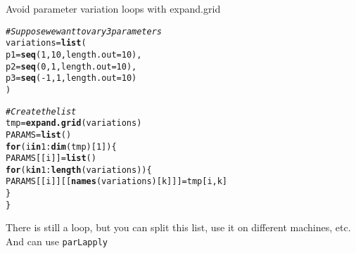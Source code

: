 \documentclass[aspectratio=169]{beamer}\usepackage[]{graphicx}\usepackage[]{xcolor}
\makeatletter
\newcommand{\hlnum}[1]{\textcolor[rgb]{0.686,0.059,0.569}{#1}}%
\newcommand{\hlcom}[1]{\textcolor[rgb]{0.678,0.584,0.686}{\textit{#1}}}%
\newcommand{\hlopt}[1]{\textcolor[rgb]{0,0,0}{#1}}%
\newcommand{\hldef}[1]{\textcolor[rgb]{0.345,0.345,0.345}{#1}}%
\newcommand{\hlkwa}[1]{\textcolor[rgb]{0.161,0.373,0.58}{\textbf{#1}}}%
\newcommand{\hlkwb}[1]{\textcolor[rgb]{0.69,0.353,0.396}{#1}}%
\newcommand{\hlkwc}[1]{\textcolor[rgb]{0.333,0.667,0.333}{#1}}%
\newcommand{\hlkwd}[1]{\textcolor[rgb]{0.737,0.353,0.396}{\textbf{#1}}}%
\newenvironment{kframe}{%
 \def\at@end@of@kframe{}%
 \ifinner\ifhmode%
  \def\at@end@of@kframe{\end{minipage}}%
  \begin{minipage}{\columnwidth}%
 \fi\fi%
 \def\FrameCommand##1{\hskip\@totalleftmargin \hskip-\fboxsep
 \colorbox{shadecolor}{##1}\hskip-\fboxsep
     \hskip-\linewidth \hskip-\@totalleftmargin \hskip\columnwidth}%
 \MakeFramed {\advance\hsize-\width
   \@totalleftmargin\z@ \linewidth\hsize
   \@setminipage}}%
 {\par\unskip\endMakeFramed%
 \at@end@of@kframe}
\newenvironment{knitrout}{}{} %
\makeatother
\begin{document}
\begin{frame}[fragile]{Avoid parameter variation loops with expand.grid}
\begin{knitrout}
\color{fgcolor}\begin{kframe}
\begin{alltt}
\hlcom{# Suppose we want to vary 3 parameters}
\hldef{variations} \hlkwb{=} \hlkwd{list}\hldef{(}
    \hlkwc{p1} \hldef{=} \hlkwd{seq}\hldef{(}\hlnum{1}\hldef{,} \hlnum{10}\hldef{,} \hlkwc{length.out} \hldef{=} \hlnum{10}\hldef{),}
    \hlkwc{p2} \hldef{=} \hlkwd{seq}\hldef{(}\hlnum{0}\hldef{,} \hlnum{1}\hldef{,} \hlkwc{length.out} \hldef{=} \hlnum{10}\hldef{),}
    \hlkwc{p3} \hldef{=} \hlkwd{seq}\hldef{(}\hlopt{-}\hlnum{1}\hldef{,} \hlnum{1}\hldef{,} \hlkwc{length.out} \hldef{=} \hlnum{10}\hldef{)}
\hldef{)}

\hlcom{# Create the list}
\hldef{tmp} \hlkwb{=} \hlkwd{expand.grid}\hldef{(variations)}
\hldef{PARAMS} \hlkwb{=} \hlkwd{list}\hldef{()}
\hlkwa{for} \hldef{(i} \hlkwa{in} \hlnum{1}\hlopt{:}\hlkwd{dim}\hldef{(tmp)[}\hlnum{1}\hldef{]) \{}
    \hldef{PARAMS[[i]]} \hlkwb{=} \hlkwd{list}\hldef{()}
    \hlkwa{for} \hldef{(k} \hlkwa{in} \hlnum{1}\hlopt{:}\hlkwd{length}\hldef{(variations)) \{}
        \hldef{PARAMS[[i]][[}\hlkwd{names}\hldef{(variations)[k]]]} \hlkwb{=} \hldef{tmp[i, k]}
    \hldef{\}}
\hldef{\}}
\end{alltt}
\end{kframe}
\end{knitrout}

There is still a loop, but you can split this list, use it on different machines, etc. And can use \texttt{parLapply}
\end{frame}
\end{document}
